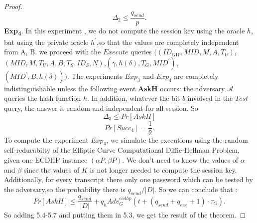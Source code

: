 \documentclass[a4paper,12pt]{report}
\begin{document}
\begin{proof}
\begin{equation}
\Delta_2 \leq \frac{q_{send}}{p}.
\end{equation}
\textbf{Exp\textsubscript{4}}. In this experiment , we do not
compute the session key using the oracle $h$, but using the private
oracle $h^{\prime}$,so that the values are completely independent
from A, B. we proceed with the $Execute$ queries $((ID_{GW},MID,M,A,T_U)$,$(MID,M,T_U, A,B,T_S,ID_S,N)$,$(\gamma,h(\delta),T_G,MID^{\prime})$,\\$(MID^{\prime},B,h(\delta)))$. The experiments
$Exp_3$ and $Exp_4$ are completely indistinguishable unless the
following event \textbf{AskH} occurs: the adversary $\mathcal{A}$
queries the hash function $h$. In addition, whatever the bit $b$
involved in the $Test$ query, the answer is random and independent
for all session. So
\begin{equation}
\Delta_3 \leq Pr[AskH]
\end{equation}
$$Pr[Succ_4] = \frac{1}{2}.$$
To compute the experiment $Exp_4$, we simulate the executions using the random self-reducabilty of the Elliptic Curve Computational Diffie-Hellman Problem, given one ECDHP instance $(\alpha P, \beta P)$. We don't need to know the values of $\alpha$ and $\beta$ since the values of $K$ is not longer needed to compute the session key.\\Additionally, for every transcript there only one password which can be tested by the adversary,so the probability there is $q_{send}/|D|$. So we can conclude that :
$$Pr[AskH] \leq \frac{q_{send}}{|D|} + q_hAdv_G^{ecdhp}(t+(q_{send}+q_{exe}+1)\cdot \tau_{G}).$$ So adding 5.4-5.7  and putting them in 5.3, we get the result of the theorem.
\end{proof}
\end{document}
